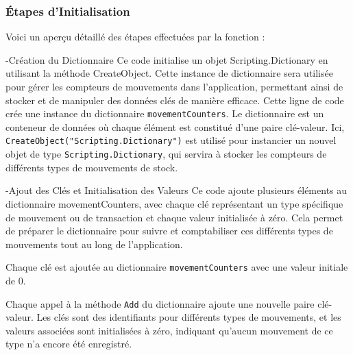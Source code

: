 \documentclass[a4paper, oneside, 12pt, final]{extreport}
\begin{document}
\subsubsection{Étapes d'Initialisation}
Voici un aperçu détaillé des étapes effectuées par la fonction :

-Création du Dictionnaire
Ce code initialise un objet Scripting.Dictionary en utilisant la méthode CreateObject. Cette instance de dictionnaire sera utilisée pour gérer les compteurs de mouvements dans l'application, permettant ainsi de stocker et de manipuler des données clés de manière efficace.
Cette ligne de code crée une instance du dictionnaire \texttt{movementCounters}. Le dictionnaire est un conteneur de données où chaque élément est constitué d'une paire clé-valeur. Ici, \texttt{CreateObject("Scripting.Dictionary")} est utilisé pour instancier un nouvel objet de type \texttt{Scripting.Dictionary}, qui servira à stocker les compteurs de différents types de mouvements de stock.

-Ajout des Clés et Initialisation des Valeurs
Ce code ajoute plusieurs éléments au dictionnaire movementCounters, avec chaque clé représentant un type spécifique de mouvement ou de transaction et chaque valeur initialisée à zéro. Cela permet de préparer le dictionnaire pour suivre et comptabiliser ces différents types de mouvements tout au long de l'application.

Chaque clé est ajoutée au dictionnaire \texttt{movementCounters} avec une valeur initiale de 0.

Chaque appel à la méthode \texttt{Add} du dictionnaire ajoute une nouvelle paire clé-valeur. Les clés sont des identifiants pour différents types de mouvements, et les valeurs associées sont initialisées à zéro, indiquant qu'aucun mouvement de ce type n'a encore été enregistré.
\end{document}
